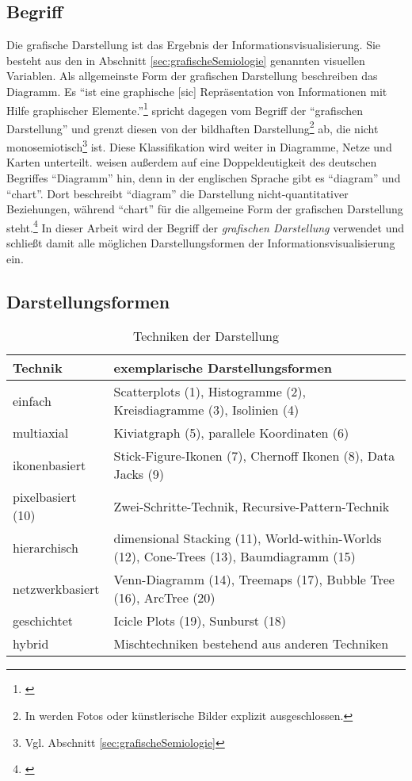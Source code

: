 \documentclass[a4paper, 
               12pt,
               DIV=calc,
               version=first,
               pdftex,
               headsepline,
               footsepline,
               bibliography=totocnumbered,
               listof=numbered]{scrreprt}
\begin{document}
\subsection{Begriff}
Die grafische Darstellung ist das Ergebnis der Informationsvisualisierung. Sie besteht
aus den in Abschnitt \ref{sec:grafischeSemiologie} genannten
visuellen Variablen.
Als allgemeinste Form der grafischen Darstellung beschreiben \cite{Schumann} das
Diagramm. Es "`ist eine graphische [sic] Repräsentation von Informationen mit Hilfe
graphischer Elemente."'\footnote{\citep[S.\,126]{Schumann}} \cite{Bertin} spricht dagegen
vom Begriff der "`grafischen Darstellung"' und grenzt diesen von
der bildhaften Darstellung\footnote{In \cite{Bertin} werden Fotos oder künstlerische Bilder explizit ausgeschlossen.}
ab, die nicht monosemiotisch\footnote{Vgl. Abschnitt \ref{sec:grafischeSemiologie}} ist.
Diese Klassifikation wird weiter in Diagramme, Netze
und Karten unterteilt. \cite{Schumann} weisen außerdem auf eine Doppeldeutigkeit
des deutschen Begriffes "`Diagramm"' hin, denn in der englischen Sprache gibt es "`diagram"' und "`chart"'.
Dort beschreibt "`diagram"' die Darstellung nicht-quantitativer Beziehungen, während "`chart"' für die
allgemeine Form der grafischen Darstellung steht.\footnote{\citep[S.\,126]{Schumann}}
In dieser Arbeit wird der Begriff der \textit{grafischen Darstellung} verwendet und schließt
damit alle möglichen Darstellungsformen der Informationsvisualisierung ein.

\subsection{Darstellungsformen}
\label{sec:Darstellungsformen}
\begin{table}
\centering
\begin{tabular}{|l|p{10cm}|}
\hline
\textbf{Technik} & \textbf{exemplarische Darstellungsformen}\\
\hline
einfach & Scatterplots (1), Histogramme (2), Kreisdiagramme (3), Isolinien (4)\\
\hline
multiaxial & Kiviatgraph (5), parallele Koordinaten (6)\\
\hline
ikonenbasiert & Stick-Figure-Ikonen (7), Chernoff Ikonen (8), Data Jacks (9)\\
\hline
pixelbasiert (10) &
Zwei-Schritte-Technik, Recursive-Pattern-Technik\\
\hline
hierarchisch & dimensional Stacking (11), World-within-Worlds (12), Cone-Trees (13), Baumdiagramm (15)\\
\hline
netzwerkbasiert & Venn-Diagramm (14), Treemaps (17), Bubble Tree (16), ArcTree (20)\\
\hline
geschichtet & Icicle Plots (19), Sunburst (18)\\
\hline
hybrid & Mischtechniken bestehend aus anderen Techniken\\
\hline
\end{tabular}
\caption{Techniken der Darstellung}
\label{tab:darstellungsformen}
\end{table}
\end{document}
